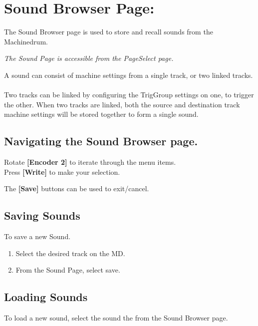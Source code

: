 \chapter{Sound Browser Page:}
The Sound Browser page is used to store and recall sounds from the Machinedrum.

 \textit{The Sound Page is accessible from the PageSelect page.}


A sound can consist of machine settings from a single track, or two linked tracks.\\
\\
Two tracks can be linked by configuring the TrigGroup settings on one, to trigger the other. When two tracks are linked, both the source and destination track machine settings will be stored together to form a single sound.


 \section{Navigating the Sound Browser page.}
Rotate \textbf{[Encoder 2]} to iterate through the menu items.\\
Press \textbf{[Write]} to make your selection.

The \textbf{[Save]} buttons can be used to exit/cancel.
 
 \section{Saving Sounds}
 To save a new Sound. 
\begin{enumerate}
 \item Select the desired track on the MD.
 \item From the Sound Page, select save.
\end{enumerate}
\section{Loading Sounds}
To load a new sound, select the sound the from the Sound Browser page.
